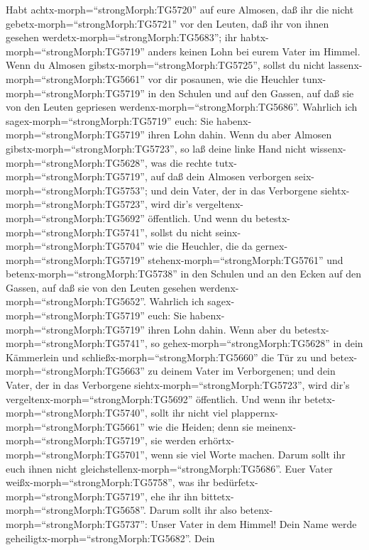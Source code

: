  Habt achtx-morph=``strongMorph:TG5720'' auf eure Almosen,
daß ihr die nicht gebetx-morph=``strongMorph:TG5721'' vor den Leuten,
daß ihr von ihnen gesehen werdetx-morph=``strongMorph:TG5683''; ihr
habtx-morph=``strongMorph:TG5719'' anders keinen Lohn bei eurem Vater im
Himmel.  Wenn du Almosen
gibstx-morph=``strongMorph:TG5725'', sollst du nicht
lassenx-morph=``strongMorph:TG5661'' vor dir posaunen, wie die Heuchler
tunx-morph=``strongMorph:TG5719'' in den Schulen und auf den Gassen, auf
daß sie von den Leuten gepriesen werdenx-morph=``strongMorph:TG5686''.
Wahrlich ich sagex-morph=``strongMorph:TG5719'' euch: Sie
habenx-morph=``strongMorph:TG5719'' ihren Lohn dahin.  Wenn
du aber Almosen gibstx-morph=``strongMorph:TG5723'', so laß deine linke
Hand nicht wissenx-morph=``strongMorph:TG5628'', was die rechte
tutx-morph=``strongMorph:TG5719'',  auf daß dein Almosen
verborgen seix-morph=``strongMorph:TG5753''; und dein Vater, der in das
Verborgene siehtx-morph=``strongMorph:TG5723'', wird dir's
vergeltenx-morph=``strongMorph:TG5692'' öffentlich.  Und
wenn du betestx-morph=``strongMorph:TG5741'', sollst du nicht
seinx-morph=``strongMorph:TG5704'' wie die Heuchler, die da
gernex-morph=``strongMorph:TG5719'' stehenx-morph=``strongMorph:TG5761''
und betenx-morph=``strongMorph:TG5738'' in den Schulen und an den Ecken
auf den Gassen, auf daß sie von den Leuten gesehen
werdenx-morph=``strongMorph:TG5652''. Wahrlich ich
sagex-morph=``strongMorph:TG5719'' euch: Sie
habenx-morph=``strongMorph:TG5719'' ihren Lohn dahin.  Wenn
aber du betestx-morph=``strongMorph:TG5741'', so
gehex-morph=``strongMorph:TG5628'' in dein Kämmerlein und
schließx-morph=``strongMorph:TG5660'' die Tür zu und
betex-morph=``strongMorph:TG5663'' zu deinem Vater im Verborgenen; und
dein Vater, der in das Verborgene siehtx-morph=``strongMorph:TG5723'',
wird dir's vergeltenx-morph=``strongMorph:TG5692'' öffentlich.
 Und wenn ihr betetx-morph=``strongMorph:TG5740'', sollt ihr
nicht viel plappernx-morph=``strongMorph:TG5661'' wie die Heiden; denn
sie meinenx-morph=``strongMorph:TG5719'', sie werden
erhörtx-morph=``strongMorph:TG5701'', wenn sie viel Worte machen.
 Darum sollt ihr euch ihnen nicht
gleichstellenx-morph=``strongMorph:TG5686''. Euer Vater
weißx-morph=``strongMorph:TG5758'', was ihr
bedürfetx-morph=``strongMorph:TG5719'', ehe ihr ihn
bittetx-morph=``strongMorph:TG5658''.  Darum sollt ihr also
betenx-morph=``strongMorph:TG5737'': Unser Vater in dem Himmel! Dein
Name werde geheiligtx-morph=``strongMorph:TG5682''.  Dein
